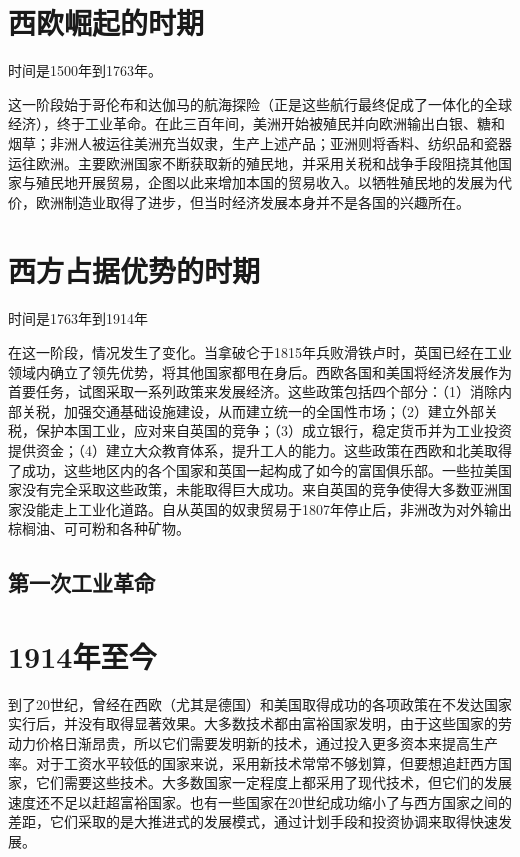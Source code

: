 \documentclass[12pt,oneside]{book}
\begin{document}
\part{西欧崛起的时期}
时间是1500年到1763年。


\begin{bookref}[frametitle={\cite{全球经济史}}]
这一阶段始于哥伦布和达伽马的航海探险（正是这些航行最终促成了一体化的全球经济），终于工业革命。在此三百年间，美洲开始被殖民并向欧洲输出白银、糖和烟草；非洲人被运往美洲充当奴隶，生产上述产品；亚洲则将香料、纺织品和瓷器运往欧洲。主要欧洲国家不断获取新的殖民地，并采用关税和战争手段阻挠其他国家与殖民地开展贸易，企图以此来增加本国的贸易收入。以牺牲殖民地的发展为代价，欧洲制造业取得了进步，但当时经济发展本身并不是各国的兴趣所在。
\end{bookref}




\part{西方占据优势的时期}
时间是1763年到1914年

\begin{bookref}[frametitle={\cite{全球经济史}}]
在这一阶段，情况发生了变化。当拿破仑于1815年兵败滑铁卢时，英国已经在工业领域内确立了领先优势，将其他国家都甩在身后。西欧各国和美国将经济发展作为首要任务，试图采取一系列政策来发展经济。这些政策包括四个部分：（1）消除内部关税，加强交通基础设施建设，从而建立统一的全国性市场；（2）建立外部关税，保护本国工业，应对来自英国的竞争；（3）成立银行，稳定货币并为工业投资提供资金；（4）建立大众教育体系，提升工人的能力。这些政策在西欧和北美取得了成功，这些地区内的各个国家和英国一起构成了如今的富国俱乐部。一些拉美国家没有完全采取这些政策，未能取得巨大成功。来自英国的竞争使得大多数亚洲国家没能走上工业化道路。自从英国的奴隶贸易于1807年停止后，非洲改为对外输出棕榈油、可可粉和各种矿物。
\end{bookref}

\chapter{第一次工业革命}





\part{1914年至今}

\begin{bookref}[frametitle={\cite{全球经济史}}]
到了20世纪，曾经在西欧（尤其是德国）和美国取得成功的各项政策在不发达国家实行后，并没有取得显著效果。大多数技术都由富裕国家发明，由于这些国家的劳动力价格日渐昂贵，所以它们需要发明新的技术，通过投入更多资本来提高生产率。对于工资水平较低的国家来说，采用新技术常常不够划算，但要想追赶西方国家，它们需要这些技术。大多数国家一定程度上都采用了现代技术，但它们的发展速度还不足以赶超富裕国家。也有一些国家在20世纪成功缩小了与西方国家之间的差距，它们采取的是大推进式的发展模式，通过计划手段和投资协调来取得快速发展。
\end{bookref}
\end{document}
